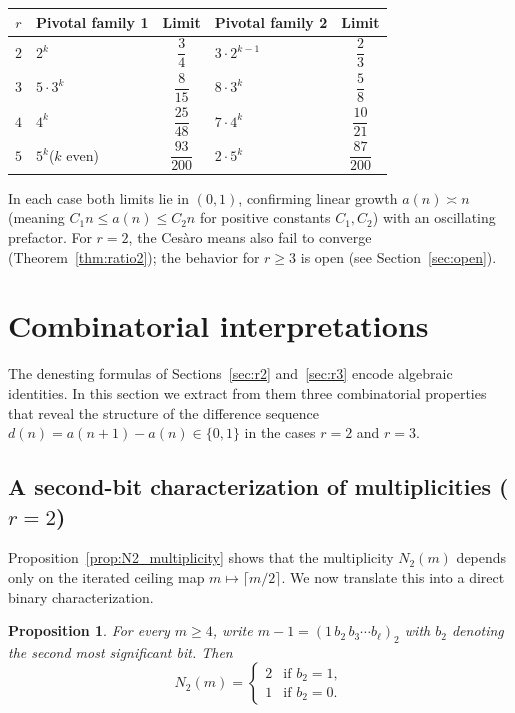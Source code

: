 \documentclass[12pt]{article}
\newtheorem{proposition}[theorem]{Proposition}
\theoremstyle{definition}
\theoremstyle{remark}
\begin{document}
\medskip
\begin{center}
\renewcommand{\arraystretch}{1.6}
\begin{tabular}{c|l|c|l|c}
$r$ & Pivotal family 1 & Limit & Pivotal family 2 & Limit \\\hline
$2$ & $2^k$ & $\dfrac{3}{4}$ & $3\cdot 2^{k-1}$ & $\dfrac{2}{3}$ \\[4pt]
$3$ & $5\cdot 3^k$ & $\dfrac{8}{15}$ & $8\cdot 3^k$ & $\dfrac{5}{8}$ \\[4pt]
$4$ & $4^k$ & $\dfrac{25}{48}$ & $7\cdot 4^k$ & $\dfrac{10}{21}$ \\[4pt]
$5$ & $5^k$\;($k$ even) & $\dfrac{93}{200}$ & $2\cdot 5^k$ & $\dfrac{87}{200}$ \\
\end{tabular}
\end{center}
\medskip

In each case both limits lie in $(0,1)$, confirming linear growth $a(n)\asymp n$
(meaning $C_1 n \le a(n) \le C_2 n$ for positive constants $C_1,C_2$)
with an oscillating prefactor. For $r=2$, the Ces\`aro means also fail to converge
(Theorem~\ref{thm:ratio2}); the behavior for $r\ge 3$ is open
(see Section~\ref{sec:open}).

\section{Combinatorial interpretations}\label{sec:combinatorial}

The denesting formulas of Sections~\ref{sec:r2} and~\ref{sec:r3}
encode algebraic identities. In this section we extract from them
three combinatorial properties that reveal the
structure of the difference sequence $d(n)=a(n+1)-a(n)\in\{0,1\}$
in the cases $r=2$ and $r=3$.

\subsection{A second-bit characterization of multiplicities ($r=2$)}

Proposition~\ref{prop:N2_multiplicity} shows that the multiplicity
$N_2(m)$ depends only on the iterated ceiling map
$m\mapsto\lceil m/2\rceil$. We now translate this into a direct
binary characterization.

\begin{proposition}\label{prop:second-bit}
For every $m\ge 4$, write $m-1=(1\,b_2\,b_3\cdots b_\ell)_2$ with
$b_2$ denoting the second most significant bit. Then
\[
  N_2(m)=\begin{cases}
    2 & \text{if } b_2=1,\\
    1 & \text{if } b_2=0.
  \end{cases}
\]
\end{proposition}
\end{document}
